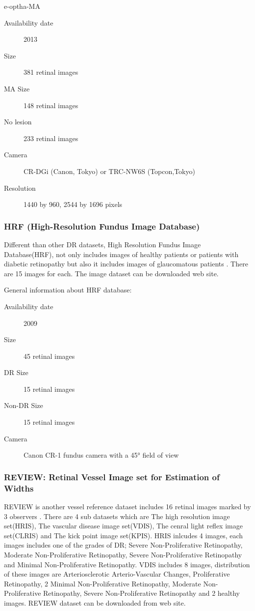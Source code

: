 e-optha-MA
\begin{description}
    \item[Availability date] 2013
    \item[Size] 381 retinal images
    \item[MA Size] 148 retinal images
    \item[No lesion] 233 retinal images
    \item[Camera] CR-DGi (Canon, Tokyo) or TRC-NW6S (Topcon,Tokyo) 
    \item[Resolution] 1440 by 960, 2544 by 1696 pixels
\end{description}


\subsubsection{HRF (High-Resolution Fundus Image Database)}
Different than other DR datasets, High Resolution Fundus Image Database(HRF), not only includes images of healthy patients or patients with diabetic retinopathy but also it includes images of glaucomatous patients \citep{budai2009multiscale}. There are 15 images for each. The image dataset can be downloaded \citet{HRF-DB} web site.


General information about HRF database:
\begin{description}
    \item[Availability date] 2009
    \item[Size] 45 retinal images
    \item[DR Size] 15 retinal images
    \item[Non-DR Size] 15 retinal images
    \item[Camera] Canon CR-1 fundus camera with a 45° field of view
\end{description}

\subsubsection{REVIEW: Retinal Vessel Image set for Estimation of Widths}

REVIEW is another vessel reference dataset includes 16 retinal images marked by 3 observers \citep{al2008review}. There are 4 sub datasets which are The high resolution image set(HRIS), The vascular disease image set(VDIS), The cenral light reflex image set(CLRIS) and The kick point image set(KPIS). 
HRIS inlcudes 4 images, each images includes one of the grades of DR; Severe Non-Proliferative Retinopathy, Moderate Non-Proliferative Retinopathy, Severe Non-Proliferative Retinopathy and Minimal Non-Proliferative Retinopathy. VDIS includes 8 images, distribution of these images are Arteriosclerotic Arterio-Vascular Changes, Proliferative Retinopathy, 2 Minimal Non-Proliferative Retinopathy, Moderate Non-Proliferative Retinopathy, Severe Non-Proliferative Retinopathy and 2 healthy images. REVIEW dataset can be downloaded from \citet{REVIEWDB} web site.

